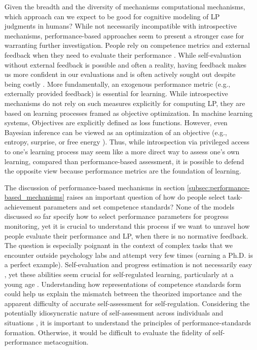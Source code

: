 Given the breadth and the diversity of mechanisms computational mechanisms, which approach can we expect to be good for cognitive modeling of \ac{LP} judgments in humans? While not necessarily incompatible with introspective mechanisms, performance-based approaches seem to present a stronger case for warranting further investigation. People rely on competence metrics and external feedback when they need to evaluate their performance \parencite{marti_certainty_2018,desender_subjective_2018,locke_performance_2020}. While self-evaluation without external feedback is possible and often a reality, having feedback makes us more confident in our evaluations \parencite{rouault_forming_2019} and is often actively sought out despite being costly \parencite{holm_episodic_2019,fitzgibbon_lure_2021}. More fundamentally, an exogenous performance metric (e.g., externally provided feedback) is essential for learning. While introspective mechanisms do not rely on such measures explicitly for computing \ac{LP}, they are based on learning processes framed as objective optimization. In machine learning systems, Objectives are explicitly defined as loss functions. However, even Bayesian inference can be viewed as an optimization of an objective (e.g., entropy, surprise, or free energy \parencite{friston_free-energy_2009}). Thus, while introspection via privileged access to one's learning process may seem like a more direct way to assess one's own learning, compared than performance-based assessment, it is possible to defend the opposite view because performance metrics are the foundation of learning.

The discussion of performance-based mechanisms in section \autoref{subsec:performance-based_mechanisms} raises an important question of how do people select task-achievement parameters and set competence standards? None of the models discussed so far specify how to select performance parameters for progress monitoring, yet it is crucial to understand this process if we want to unravel how people evaluate their performance and \ac{LP}, when there is no normative feedback. The question is especially poignant in the context of complex tasks that we encounter outside psychology labs and attempt very few times (earning a Ph.D. is a perfect example). Self-evaluation and progress estimation is not necessarily easy \parencite{townsend_judgments_2011,townsend_metacognitive_2011,yan_difficulty_2016,raaijmakers_effects_2019}, yet these abilities seem crucial for self-regulated learning, particularly at a young age \parencite{oudeyer_computational_2018}. Understanding how representations of competence standards form could help us explain the mismatch between the theorized importance and the apparent difficulty of accurate self-assessment for self-regulation. Considering the potentially idiosyncratic nature of self-assessment across individuals and situations \parencite{boekaerts_subjective_1991}, it is important to understand the principles of performance-standards formation. Otherwise, it would be difficult to evaluate the fidelity of self-performance metacognition. 

